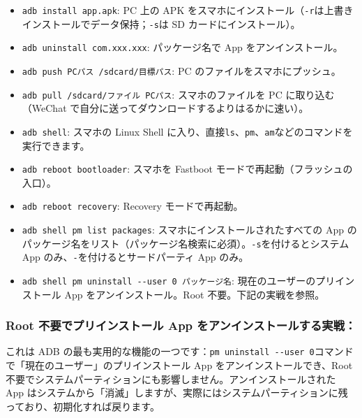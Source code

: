 \begin{itemize}
  \item \texttt{adb install app.\allowbreak apk}: PC 上の APK をスマホにインストール（\texttt{-\allowbreak r}は上書きインストールでデータ保持；\texttt{-\allowbreak s}は SD カードにインストール）。
  \item \texttt{adb uninstall com.\allowbreak xxx.\allowbreak xxx}: パッケージ名で App をアンインストール。
  \item \texttt{adb push PCパス /\allowbreak sdcard/\allowbreak 目標パス}: PC のファイルをスマホにプッシュ。
  \item \texttt{adb pull /\allowbreak sdcard/\allowbreak ファイル PCパス}: スマホのファイルを PC に取り込む（WeChat で自分に送ってダウンロードするよりはるかに速い）。
  \item \texttt{adb shell}: スマホの Linux Shell に入り、直接\texttt{ls}、\texttt{pm}、\texttt{am}などのコマンドを実行できます。
  \item \texttt{adb reboot bootloader}: スマホを Fastboot モードで再起動（フラッシュの入口）。
  \item \texttt{adb reboot recovery}: Recovery モードで再起動。
  \item \texttt{adb shell pm list packages}: スマホにインストールされたすべての App のパッケージ名をリスト（パッケージ名検索に必須）。\texttt{-\allowbreak s}を付けるとシステム App のみ、\texttt{-}を付けるとサードパーティ App のみ。
  \item \texttt{adb shell pm uninstall -\allowbreak -\allowbreak user 0 パッケージ名}: 現在のユーザーのプリインストール App をアンインストール。Root 不要。下記の実戦を参照。
\end{itemize}

\subsubsection*{Root 不要でプリインストール App をアンインストールする実戦：}

これは ADB の最も実用的な機能の一つです：\texttt{pm uninstall -\allowbreak -\allowbreak user 0}コマンドで「現在のユーザー」のプリインストール App をアンインストールでき、Root 不要でシステムパーティションにも影響しません。アンインストールされた App はシステムから「消滅」しますが、実際にはシステムパーティションに残っており、初期化すれば戻ります。

